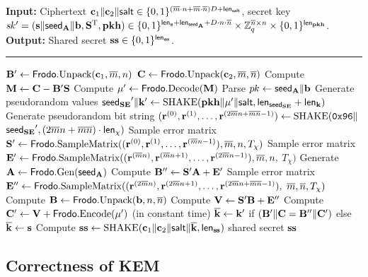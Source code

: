 \begin{algorithm}
\caption{\label{alg:KEM:Decaps} $\FrodoKEM.\Decaps$.}
{\bf Input:} Ciphertext $\bfc_1 \| \bfc_2{\color{black}\| \salt} \in \{0,1\}^{(\mbar\cdot n +\mbar\cdot\nbar)D {\color{black}+\lengthsalt}}$, secret key $\sk' = (\bfs \| \seedA \| \bfb, \bfS^\text{T}, \pkh) \in  \{0,1\}^{\lengths + \lengthseedA +D\cdot n \cdot \nbar}\times \bbZ_q^{\nbar\times n} \times \{0,1\}^{\lengthpkhash}$.\\
{\bf Output:} Shared secret $\ssk \in \{0,1\}^\lengthss$.\\[-1.5ex]
\rule{\linewidth}{.5pt}
\vspace{-0.5cm}
\begin{algorithmic}[1]
    \STATE $\bfB' \gets \Frodo.\Unpack(\bfc_1, \mbar, n)$
    \STATE $\bfC \gets \Frodo.\Unpack(\bfc_2, \mbar, \nbar)$    
    \STATE Compute $\bfM \gets \bfC - \bfB'\bfS$
    \STATE Compute $\mu' \gets \Frodo.\Decode(\bfM)$
    \STATE Parse $\pk \gets \seedA \|\bfb$
    \STATE Generate pseudorandom values $\seedSE'\| \bfk' \gets \SHAKE(\pkh \| \mu'{\color{black}\| \salt}, \lengthseedSE + \lengthK)$
   \STATE Generate pseudorandom bit string $ (\bfr^{(0)}, \bfr^{(1)}, \dots, \bfr^{(2\mbar n+\mbar\nbar-1)}) \gets \SHAKE(\mathtt{0x96} \|$ $\seedSE', (2\mbar n+\mbar\nbar) \cdot \lengthchi)$
    \STATE Sample error matrix $\bfS' \gets \Frodo.\SampV((\bfr^{(0)}, \bfr^{(1)}, \dots, \bfr^{(\mbar n-1)}), \mbar, n, T_\chi)$
    \STATE Sample error matrix $\bfE' \gets \Frodo.\SampV((\bfr^{(\mbar n)}, \bfr^{(\mbar n+1)}, \dots, \bfr^{(2\mbar n-1)}), \mbar, n,$ $T_\chi)$
    \STATE Generate $\bfA\gets \Frodo.\gen(\seedA)$
    \STATE Compute $\bfB'' \gets \bfS'\bfA + \bfE'$
    \STATE Sample error matrix $\bfE'' \gets \Frodo.\SampV((\bfr^{(2\mbar n)}, \bfr^{(2\mbar n+1)}, \dots, \bfr^{(2\mbar n+\mbar\nbar-1)}),$ $\mbar, \nbar, T_\chi)$
    \STATE Compute $\bfB \gets \Frodo.\Unpack(\bfb,n,\nbar)$
    \STATE Compute $\bfV \gets \bfS'\bfB + \bfE''$
    \STATE Compute $\bfC' \gets \bfV + \Frodo.\Encode(\mu')$
    \STATE (in constant time) $\overline{\bfk} \gets \bfk'$ if $(\bfB' \| \bfC = \bfB'' \| \bfC')$ else $\overline{\bfk} \gets \bfs$
    \STATE Compute $\ssk \gets \SHAKE(\bfc_1 \| \bfc_2{\color{black}\| \salt} \| \overline{\bfk}, \lengthss)$
    \RETURN shared secret $\ssk$
    \end{algorithmic}
\end{algorithm}   

\subsection{Correctness of \INDCCA KEM}\label{sec:cca-kem-correctness}

